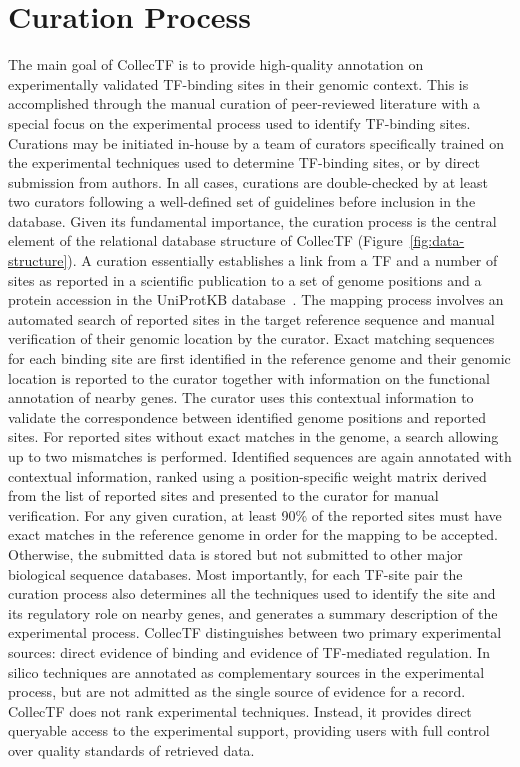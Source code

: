 \section{Curation Process}


The main goal of CollecTF is to provide high-quality annotation on
experimentally validated TF-binding sites in their genomic context. This is
accomplished through the manual curation of peer-reviewed literature with a
special focus on the experimental process used to identify TF-binding
sites. Curations may be initiated in-house by a team of curators specifically
trained on the experimental techniques used to determine TF-binding sites, or
by direct submission from authors. In all cases, curations are double-checked
by at least two curators following a well-defined set of guidelines before
inclusion in the database. Given its fundamental importance, the curation
process is the central element of the relational database structure of CollecTF
(Figure~\ref{fig:data-structure}). A curation essentially establishes a link
from a TF and a number of sites as reported in a scientific publication to a
set of genome positions and a protein accession in the UniProtKB
database~\cite{uniprot2014uniprot}. The mapping process involves an automated
search of reported sites in the target reference sequence and manual
verification of their genomic location by the curator. Exact matching sequences
for each binding site are first identified in the reference genome and their
genomic location is reported to the curator together with information on the
functional annotation of nearby genes. The curator uses this contextual
information to validate the correspondence between identified genome positions
and reported sites. For reported sites without exact matches in the genome, a
search allowing up to two mismatches is performed. Identified sequences are
again annotated with contextual information, ranked using a position-specific
weight matrix derived from the list of reported sites and presented to the
curator for manual verification. For any given curation, at least 90\% of the
reported sites must have exact matches in the reference genome in order for the
mapping to be accepted. Otherwise, the submitted data is stored but not
submitted to other major biological sequence databases. Most importantly, for
each TF-site pair the curation process also determines all the techniques used
to identify the site and its regulatory role on nearby genes, and generates a
summary description of the experimental process. CollecTF distinguishes between
two primary experimental sources: direct evidence of binding and evidence of
TF-mediated regulation. In silico techniques are annotated as complementary
sources in the experimental process, but are not admitted as the single source
of evidence for a record. CollecTF does not rank experimental
techniques. Instead, it provides direct queryable access to the experimental
support, providing users with full control over quality standards of retrieved
data.

